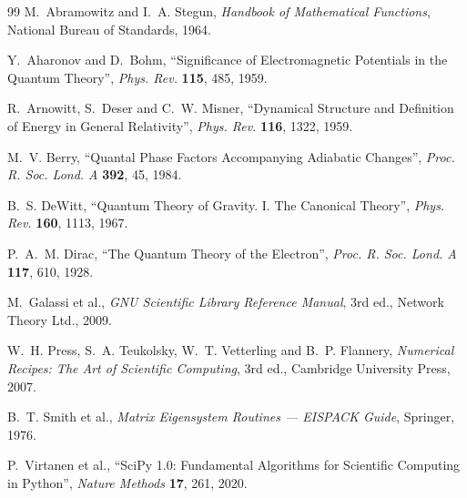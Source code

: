 \documentclass[11pt,a4paper]{article}
\theoremstyle{plain}
\theoremstyle{definition}
\begin{document}
\begin{thebibliography}{99}\footnotesize
{}
M.~Abramowitz and I.~A. Stegun, \emph{Handbook of Mathematical Functions},
National Bureau of Standards, 1964.

Y.~Aharonov and D.~Bohm, ``Significance of Electromagnetic Potentials in the
Quantum Theory'', \emph{Phys. Rev.} \textbf{115}, 485, 1959.

R.~Arnowitt, S.~Deser and C.~W. Misner, ``Dynamical Structure and Definition of
Energy in General Relativity'', \emph{Phys. Rev.} \textbf{116}, 1322, 1959.

M.~V. Berry, ``Quantal Phase Factors Accompanying Adiabatic Changes'',
\emph{Proc. R. Soc. Lond. A} \textbf{392}, 45, 1984.

B.~S. DeWitt, ``Quantum Theory of Gravity. I. The Canonical Theory'',
\emph{Phys. Rev.} \textbf{160}, 1113, 1967.

P.~A.~M. Dirac, ``The Quantum Theory of the Electron'', \emph{Proc. R. Soc.
Lond. A} \textbf{117}, 610, 1928.

M.~Galassi et al., \emph{GNU Scientific Library Reference Manual}, 3rd ed.,
Network Theory Ltd., 2009.

W.~H. Press, S.~A. Teukolsky, W.~T. Vetterling and B.~P. Flannery,
\emph{Numerical Recipes: The Art of Scientific Computing}, 3rd ed.,
Cambridge University Press, 2007.

B.~T. Smith et al., \emph{Matrix Eigensystem Routines --- EISPACK Guide},
Springer, 1976.

P.~Virtanen et al., ``SciPy 1.0: Fundamental Algorithms for Scientific Computing
in Python'', \emph{Nature Methods} \textbf{17}, 261, 2020.
\end{thebibliography}
\end{document}
